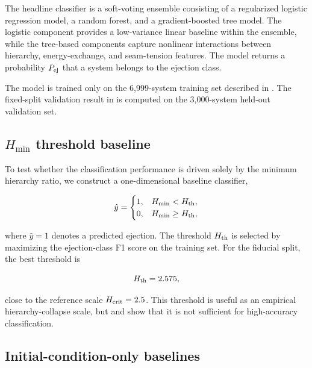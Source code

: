 \documentclass[12pt,a4paper]{article}
\newcommand{\Hcrit}{H_{\rm crit}}
\newcommand{\Hmin}{H_{\min}}
\newcommand{\Pej}{P_{\rm ej}}
\begin{document}
The headline classifier is a soft-voting ensemble consisting of a regularized logistic regression model, a random forest, and a gradient-boosted tree model. The logistic component provides a low-variance linear baseline within the ensemble, while the tree-based components capture nonlinear interactions between hierarchy, energy-exchange, and seam-tension features. The model returns a probability \(\Pej\) that a system belongs to the ejection class.

The model is trained only on the 6,999-system training set described in . The fixed-split validation result in  is computed on the 3,000-system held-out validation set.

\subsection{\texorpdfstring{\(\Hmin\)}{Hmin} threshold baseline}
\label{sec:Hmin_baseline}

To test whether the classification performance is driven solely by the minimum hierarchy ratio, we construct a one-dimensional baseline classifier,

\begin{equation}
    \hat y =
    \begin{cases}
    1, & \Hmin < H_{\rm th},\\
    0, & \Hmin \geq H_{\rm th},
    \end{cases}
    \label{eq:Hmin_baseline}
\end{equation}

where \(\hat y=1\) denotes a predicted ejection. The threshold \(H_{\rm th}\) is selected by maximizing the ejection-class F1 score on the training set. For the fiducial split, the best threshold is

\begin{equation}
    H_{\rm th}=2.575,
    \label{eq:best_h_threshold}
\end{equation}

close to the reference scale \(\Hcrit=2.5\). This threshold is useful as an empirical hierarchy-collapse scale, but  and  show that it is not sufficient for high-accuracy classification.

\subsection{Initial-condition-only baselines}
\label{sec:initial_condition_baselines}
\end{document}

